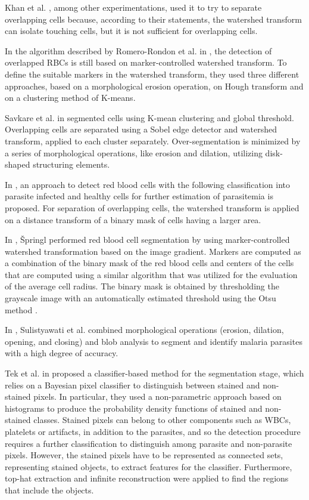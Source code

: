 Khan et al. \cite{Khan2011}, among other experimentations, used it to try to separate overlapping cells because, according to their statements, the watershed transform can isolate touching cells, but it is not sufficient for overlapping cells.

In the algorithm described by Romero-Rondon et al. in \cite{Romero2016}, the detection of overlapped RBCs is still based on marker-controlled watershed transform. To define the suitable markers in the watershed transform, they used three different approaches, based on a morphological erosion operation, on Hough transform and on a clustering method of K-means.

{Savkare et al. in \cite{Savkare2015} segmented cells using K-mean clustering and global threshold. Overlapping cells are separated using a Sobel edge detector and watershed transform, applied to each cluster separately. Over-segmentation is minimized by a series of morphological operations, like erosion and dilation, utilizing disk-shaped structuring elements.
	
	In \cite{Savkare2011a}, an approach to detect red blood cells with the following classification into parasite infected and healthy cells for further estimation of parasitemia is proposed. For separation of overlapping cells, the watershed transform is applied on a distance transform of a binary mask of cells having a larger area.
	
	In \cite{Springl2009}, {\v{S}}pringl performed red blood cell segmentation by using marker-controlled watershed transformation based on the image gradient. Markers are computed as a combination of the binary mask of the red blood cells and centers of the cells that are computed using a similar algorithm that was utilized for the evaluation of the average cell radius. The binary mask is obtained by thresholding the grayscale image with an automatically estimated threshold using the Otsu method \cite{Otsu}.
	
	In \cite{Sulist2015}, Sulistyawati et al. combined morphological operations (erosion, dilation, opening, and closing) and blob analysis to segment and identify malaria parasites with a high degree of accuracy.
	
	Tek et al. in \cite{Tek2006} proposed a classifier-based method for the segmentation stage, which relies on a Bayesian pixel classifier to distinguish between stained and non-stained pixels. In particular, they used a non-parametric approach based on histograms to produce the probability density functions of stained and non-stained classes. Stained pixels can belong to other components such as WBCs, platelets or artifacts, in addition to the parasites, and so the detection procedure requires a further classification to distinguish among parasite and non-parasite pixels. However, the stained pixels have to be represented as connected sets, representing stained objects, to extract features for the classifier. Furthermore, top-hat extraction and infinite reconstruction were applied to find the regions that include the objects.
	
}
